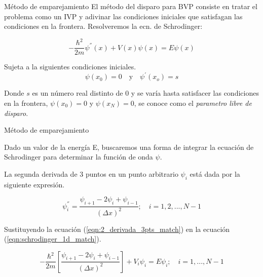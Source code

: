 \begin{frame}{Método de emparejamiento}
    El método del disparo para BVP  consiste en tratar el problema como un IVP y adivinar las condiciones iniciales que satisfagan las condiciones en la frontera. Resolveremos la ecn. de Schrodinger:

    \begin{equation}
        -\frac{\hbar^2}{2m} \psi^{''}(x) + V(x)\psi(x) = E\psi(x) 
        \label{eqn:schrodinger_1d_match}
    \end{equation}
    
    Sujeta a la siguientes condiciones iniciales.
    \begin{equation}
        \psi(x_0) = 0
        \quad \text{y} \quad
        \psi^{'}(x_o) = s
    \end{equation}

    Donde $s$ es un número real distinto de 0 y se varía hasta satisfacer las condiciones en la frontera, $\psi(x_0) = 0$ y $\psi(x_N) = 0$, se conoce como el \emph{parametro libre de disparo}.
\end{frame}

\begin{frame}{Método de emparejamiento}

    Dado un valor de la energía E, buscaremos una forma de integrar la ecuación de Schrodinger para determinar la función de onda $\psi$.
    
    \vspace{0.2cm}

    La segunda derivada de 3 puntos en un punto arbitrario $\psi_i$ está dada por la siguiente expresión.

    \begin{equation}
        \psi_{i}^{''} 
        =
        \frac{ \psi_{i+1} - 2\psi_{i} +  \psi_{i-1} }{ (\Delta x)^2 }
        ;\quad
        i= 1,2,...,N-1
        \label{eqn:2_derivada_3pts_match}
    \end{equation}

    Sustituyendo la ecuación (\ref{eqn:2_derivada_3pts_match}) en la ecuación (\ref{eqn:schrodinger_1d_match}).

    \begin{equation}
        -\frac{\hbar^2}{2m} \left[ 
            \frac{ \psi_{i+1} - 2\psi_{i} +  \psi_{i-1} }{ (\Delta x)^2 }
         \right] + V_i\psi_i 
         = 
         E\psi_i 
         ;\quad
        i= 1,...,N-1
         \label{eqn:discrete_schrodinger_matching}
    \end{equation}

\end{frame}

